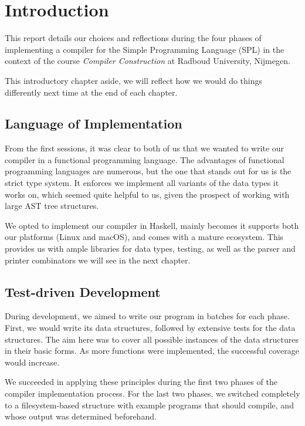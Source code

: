 \chapter{Introduction}

This report details our choices and reflections during the four phases of implementing a compiler for the Simple Programming Language (SPL) in the context of the course \emph{Compiler Construction} at Radboud University, Nijmegen.

This introductory chapter aside, we will reflect how we would do things differently next time at the end of each chapter.

\section{Language of Implementation}

From the first sessions, it was clear to both of us that we wanted to write our compiler in a functional programming language.
The advantages of functional programming languages are numerous, but the one that stands out for us is the strict type system.
It enforces we implement all variants of the data types it works on, which seemed quite helpful to us, given the prospect of working with large AST tree structures.

We opted to implement our compiler in Haskell, mainly becomes it supports both our platforms (Linux and macOS), and comes with a mature ecosystem.
This provides us with ample libraries for data types, testing, as well as the parser and printer combinators we will see in the next chapter.


\section{Test-driven Development}

During development, we aimed to write our program in batches for each phase.
First, we would write its data structures, followed by extensive tests for the data structures.
The aim here was to cover all possible instances of the data structures in their basic forms.
As more functions were implemented, the successful coverage would increase.

We succeeded in applying these principles during the first two phases of the compiler implementation process.
For the last two phases, we switched completely to a filesystem-based structure with example programs that should compile, and whose output was determined beforehand.


